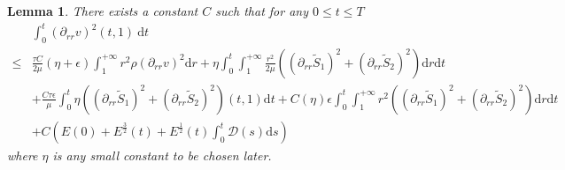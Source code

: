 \documentclass[10pt,reqno]{amsart}
\numberwithin{equation}{section}
\newtheorem{lemma}[theorem]{Lemma}
\begin{document}
	\begin{lemma}\label{lem7_xx}
		There exists a constant $C$ such that for any $0\leq t \leq T$
		\begin{align}\label{bdy}
				&\int_{0}^{t}(\partial_{rr} v)^2(t,1)\mathrm{~d}t \nonumber\\
				\leq& \frac{\tau C}{2\mu}(\eta+\epsilon)\int_{1}^{+\infty}r^2\rho(\partial_{rr} v)^2\mathrm{d}r
				+\eta\int_{0}^{t}\int_{1}^{+\infty}\frac{r^2}{2\mu}\left((\partial_{rr}\tilde{S}_1)^2+(\partial_{rr}\tilde{S}_2)^2\right)\mathrm{d}r\mathrm{d}t \nonumber\\
				&
				+\frac{C\tau\epsilon}{\mu}\int_{0}^{t}\eta\left(
				(\partial_{rr} \tilde{S}_1)^2+(\partial_{rr} \tilde{S}_2)^2\right)(t,1)\mathrm{d}t
				+C(\eta)\epsilon\int_{0}^{t}\int_{1}^{+\infty}r^2((\partial_{rr}\tilde{S}_1)^2+(\partial_{rr}\tilde{S}_2)^2)\mathrm{d}r\mathrm{d}t \nonumber\\
				&
				+C\left(E(0)+ E^{\frac{3}{2}}(t)+ E^{\frac{1}{2}}(t) \int_{0}^{t}\mathcal{D}(s)\mathrm{d}s\right)
			\end{align}
		where $\eta$ is any small constant to be chosen later.
	\end{lemma}
\end{document}
